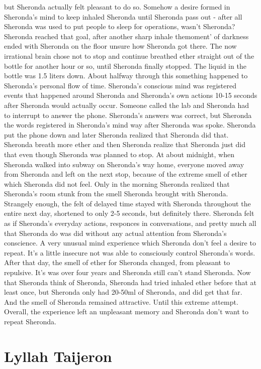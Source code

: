 \documentclass[12pt]{book}
\begin{document}
but Sheronda actually felt pleasant to do so. Somehow a desire formed in Sheronda's mind to keep inhaled Sheronda until Sheronda pass out - after all Sheronda was used to put people to sleep for operations, wasn't Sheronda? Sheronda reached that goal, after another sharp inhale themoment' of darkness ended with Sheronda on the floor unsure how Sheronda got there. The now irrational brain chose not to stop and continue breathed ether straight out of the bottle for another hour or so, until Sheronda finally stopped. The liquid in the bottle was 1.5 liters down. About halfway through this something happened to Sheronda's personal flow of time. Sheronda's conscious mind was registered events that happened around Sheronda and Sheronda's own actions 10-15 seconds after Sheronda would actually occur. Someone called the lab and Sheronda had to interrupt to answer the phone. Sheronda's answers was correct, but Sheronda the words registered in Sheronda's mind way after Sheronda was spoke. Sheronda put the phone down and later Sheronda realized that Sheronda did that. Sheronda breath more ether and then Sheronda realize that Sheronda just did that even though Sheronda was planned to stop. At about midnight, when Sheronda walked into subway on Sheronda's way home, everyone moved away from Sheronda and left on the next stop, because of the extreme smell of ether which Sheronda did not feel. Only in the morning Sheronda realized that Sheronda's room stunk from the smell Sheronda brought with Sheronda. Strangely enough, the felt of delayed time stayed with Sheronda throughout the entire next day, shortened to only 2-5 seconds, but definitely there. Sheronda felt as if Sheronda's everyday actions, responces in conversations, and pretty much all that Sheronda do was did without any actual attention from Sheronda's conscience. A very unusual mind experience which Sheronda don't feel a desire to repeat. It's a little insecure not was able to consciously control Sheronda's words. After that day, the smell of ether for Sheronda changed, from pleasant to repulsive. It's was over four years and Sheronda still can't stand Sheronda. Now that Sheronda think of Sheronda, Sheronda had tried inhaled ether before that at least once, but Sheronda only had 20-50ml of Sheronda, and did get that far. And the smell of Sheronda remained attractive. Until this extreme attempt. Overall, the experience left an unpleasant memory and Sheronda don't want to repeat Sheronda.



\chapter{Lyllah Taijeron}
\end{document}
